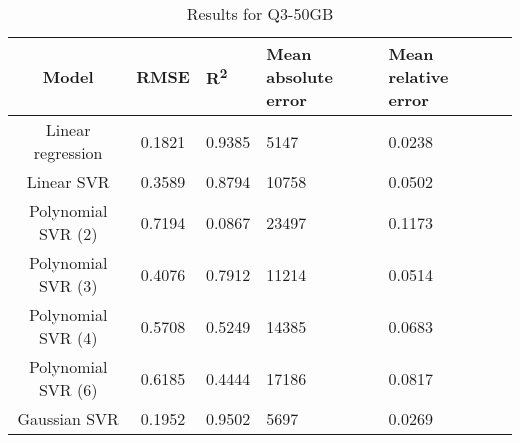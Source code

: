 \begin{table}[H]
\centering
\begin{adjustbox}{center}
\begin{tabular}{c | c M{1.2cm} M{2.5cm} M{2.5cm} M{1.8cm}}
Model & RMSE & R\textsuperscript{2} & Mean absolute error & Mean relative error \tabularnewline
\hline
Linear regression & 0.1821 & 0.9385 &   5147 & 0.0238 \\
Linear SVR & 0.3589 & 0.8794 &  10758 & 0.0502 \\
Polynomial SVR (2) & 0.7194 & 0.0867 &  23497 & 0.1173 \\
Polynomial SVR (3) & 0.4076 & 0.7912 &  11214 & 0.0514 \\
Polynomial SVR (4) & 0.5708 & 0.5249 &  14385 & 0.0683 \\
Polynomial SVR (6) & 0.6185 & 0.4444 &  17186 & 0.0817 \\
Gaussian SVR & 0.1952 & 0.9502 &   5697 & 0.0269 \\
\end{tabular}
\end{adjustbox}
\\
\caption{Results for Q3-50GB}
\label{tab:all_linear_Q3_50}
\end{table}
